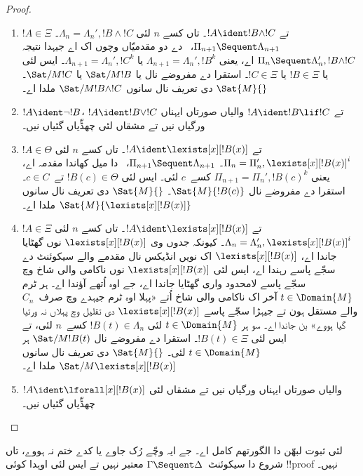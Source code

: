 \documentclass[../../../include/open-logic-section]{subfiles}
\begin{document}
\begin{proof}
\begin{enumerate}
  \item $!A \in \Xi$ تے $!A \ident !B \land !C$۔ تاں کسے $n$ لئی $ \Lambda_n = \Lambda_n', !B \land !C$۔ $\Pi_{n+1} \Sequent
  \Lambda_{n+1}$،~\RightR{\land} دے دو مقدمیّاں وچوں اک اے جیہدا نتیجہ $ \Pi_n \Sequent \Lambda'_n, !B \land !C$ اے، یعنی $ \Lambda_{n+1} = \Lambda_n', !B^k$ یا $ \Lambda_{n+1} = \Lambda_n',
  !C^k$۔ ایس لئی یا $!B \in \Xi$ یا $!C \in \Xi$۔ استقرا دے مفروضے نال یا $\Sat/{M}{!B}$ یا $\Sat/{M}{!C}$۔ $\Sat{M}{}$ دی تعریف نال سانوں $ \Sat/{M}{!B \land !C}$ ملدا اے۔

  \item $!A \ident \lnot !B$، $!A \ident !B \lor !C$ تے $!A \ident !B \lif !C$ والیاں صورتاں ایہناں ورگیاں نیں تے مشقاں لئی چھڈّیاں گئیاں نیں۔

  \item $!A \in \Theta$ تے $!A \ident \lexists[x][!B(x)]$۔ تاں کسے $n$ لئی $ \Pi_n = \Pi_n', \lexists[x][!B(x)]^i$۔ $\Pi_{n+1}
  \Sequent \Lambda_{n+1}$،~\LeftR{\lexists} دا میل کھاندا مقدمہ اے، یعنی $ \Pi_{n+1} = \Pi_n', !B(c)^k$ کسے~$c$ لئی۔ ایس لئی $!B(c) \in \Theta$ تے~$c \in C$۔ استقرا دے مفروضے نال $\Sat{M}{!B(c)}$۔ $\Sat{M}{}$ دی تعریف نال سانوں $ \Sat{M}{\lexists[x][!B(x)]}$ ملدا اے۔

  \item $!A \in \Xi$ تے $!A \ident \lexists[x][!B(x)]$۔ تاں کسے $n$ لئی $ \Lambda_n = \Lambda_n', \lexists[x][!B(x)]^i$۔ کیونکہ جدوں وی $ \lexists[x][!B(x)]$ نوں گھٹایا جاندا اے، $\lexists[x][!B(x)]$ اک نویں انڈیکس نال مقدمے والے سیکوئنٹ دے سجّے پاسے رہندا اے، ایس لئی $ \lexists[x][!B(x)]$ نوں ناکامی والی شاخ وچ سجّے پاسے لامحدود واری گھٹایا جاندا اے، جے اوہ اُتھے آؤندا اے۔ ہر ٹرم $t \in
  \Domain{M}$ آخر اک ناکامی والی شاخ اُتے «پہلا اوہ ٹرم جیہدے وچ صرف~$C_n$ والے مستقل ہون تے جیہڑا سجّے پاسے $ \lexists[x][!B(x)]$ دی تقلیل وچ پہلاں نہ ورتیا گیا ہووے» بن جاندا اے۔ سو ہر $t \in \Domain{M}$ لئی $!B(t) \in \Lambda_n$ کسے~$n$ لئی، تے ایس لئی $!B(t) \in \Xi$۔ استقرا دے مفروضے نال $ \Sat/{M}{!B(t)}$ ہر $t \in
  \Domain{M}$ لئی۔ $\Sat{M}{}$ دی تعریف نال سانوں $ \Sat/{M}{\lexists[x][!B(x)]}$ ملدا اے۔

  \item $!A \ident \lforall[x][!B(x)]$ والیاں صورتاں ایہناں ورگیاں نیں تے مشقاں لئی چھڈّیاں گئیاں نیں۔
\end{enumerate}
\end{proof}

\begin{cor}
 لئی ثبوت لبھّن دا الگورتھم کامل اے۔ جے ایہ وچّے رُک جاوے یا کدے ختم نہ ہووے، تاں شروع دا سیکوئنٹ~$\Gamma \Sequent \Delta$ معتبر نہیں تے ایس لئی اوہدا کوئی !!{proof} نہیں۔
\end{cor}
\end{document}
